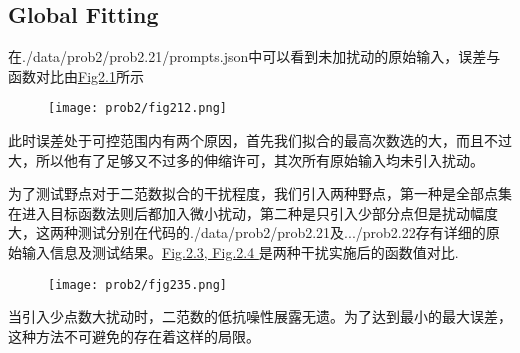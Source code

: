 \documentclass{article}
\begin{document}
\subsection{Global Fitting}
在./data/prob2/prob2.21/prompts.json中可以看到未加扰动的原始输入，误差与函数对比由\hyperref[Fig:2.1,2.2]{Fig2.1}所示
\begin{figure}[H]
    \centering
    \texttt{[image: prob2/fig212.png]}
    \label{fig:2.1,2.2}
\end{figure}
此时误差处于可控范围内有两个原因，首先我们拟合的最高次数选的大，而且不过大，所以他有了足够又不过多的伸缩许可，其次所有原始输入均未引入扰动。
\par
为了测试野点对于二范数拟合的干扰程度，我们引入两种野点，第一种是全部点集在进入目标函数法则后都加入微小扰动，第二种是只引入少部分点但是扰动幅度大，这两种测试分别在代码的./data/prob2/prob2.21及.../prob2.22存有详细的原始输入信息及测试结果。\hyperref[fig:2.21,2.22]{Fig.2.3, Fig.2.4 }是两种干扰实施后的函数值对比.
\begin{figure}[H]
    \centering
    \texttt{[image: prob2/fjg235.png]}
    \label{fig:2.21,2.22}
\end{figure}
\clearpage
当引入少点数大扰动时，二范数的低抗噪性展露无遗。为了达到最小的最大误差，这种方法不可避免的存在着这样的局限。
\end{document}
